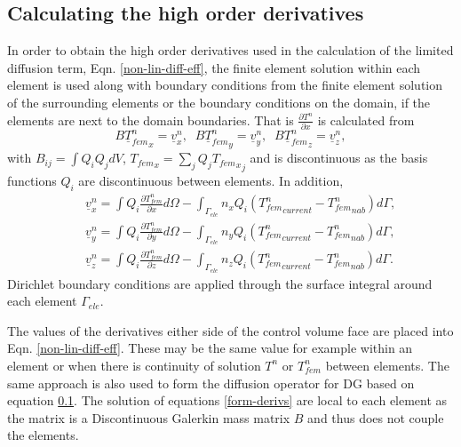 \subsection{Calculating the high order derivatives}

In order to obtain the high order derivatives used in the calculation of the limited diffusion term, Eqn. \ref{non-lin-diff-eff}, the finite element solution within each element is used along with boundary conditions from the finite element solution of the surrounding elements or the boundary conditions on the domain, if the elements are next to the domain boundaries. 
That is $\frac{\partial T^n}{\partial x}$ is calculated from
 \begin{equation}
 B {\underline T_{fem}^n}_x = \underline v_x^n, \;\;
 B {\underline T_{fem}^n}_y = \underline v_y^n, \;\;
 B {\underline T_{fem}^n}_z = \underline v_z^n, 
\label{form-derivs}
\end{equation}
with $B_{ij}=\int Q_i Q_j dV$, ${T_{fem}}_x=\sum_j Q_j {{T_{fem}}_x}_j$ and is discontinuous as the basis functions $Q_i$ are discontinuous between elements. In addition,
 \begin{eqnarray}
&& \underline v_x^n=\int Q_{i} \frac{\partial T_{fem}^n}{\partial x} d\Omega 
-\int_{\Gamma_{ele}} n_x Q_i ({T_{fem}^n}_{current}-{T_{fem}^n}_{nab})d\Gamma, \nonumber \\
&& \underline v_y^n=\int Q_{i} \frac{\partial T_{fem}^n}{\partial y} d\Omega 
-\int_{\Gamma_{ele}} n_y Q_i ({T_{fem}^n}_{current}-{T_{fem}^n}_{nab})d\Gamma, \nonumber \\
&& \underline v_z^n=\int Q_{i} \frac{\partial T_{fem}^n}{\partial z} d\Omega 
-\int_{\Gamma_{ele}} n_z Q_i ({T_{fem}^n}_{current}-{T_{fem}^n}_{nab})d\Gamma. 
\end{eqnarray}
Dirichlet boundary conditions are applied through the surface integral around each element ${\Gamma_{ele}}$.  

The values of the derivatives either side of the control volume face are placed into Eqn. \ref{non-lin-diff-eff}. These may be the same value for example within an element or when there is continuity of solution $T^n$ or $T_{fem}^n$ between elements. The same approach is also used to form the diffusion operator for DG based on equation \ref{}.  The solution of equations \ref{form-derivs} are local to each element as 
the matrix is a Discontinuous Galerkin mass matrix $B$ and 
thus does not couple the elements. 




